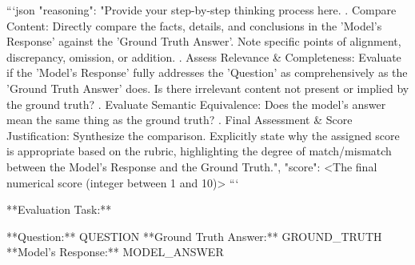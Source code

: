 \begin{tcolorbox}[colback=cadmiumgreen!5!white,colframe=forestgreen!75!white,breakable,title=\textit{LLM judge prompt for the PubMedQA free-form QA task.}]
\begin{VerbatimWrap}
```json
{
    "reasoning": "Provide your step-by-step thinking process here. . Compare Content: Directly compare the facts, details, and conclusions in the 'Model's Response' against the 'Ground Truth Answer'. Note specific points of alignment, discrepancy, omission, or addition. . Assess Relevance & Completeness: Evaluate if the 'Model's Response' fully addresses the 'Question' as comprehensively as the 'Ground Truth Answer' does. Is there irrelevant content not present or implied by the ground truth? . Evaluate Semantic Equivalence: Does the model's answer mean the same thing as the ground truth? . Final Assessment & Score Justification: Synthesize the comparison. Explicitly state why the assigned score is appropriate based on the rubric, highlighting the degree of match/mismatch between the Model's Response and the Ground Truth.",
    "score": <The final numerical score (integer between 1 and 10)>
}
```

**Evaluation Task:**

**Question:** {{QUESTION}}
**Ground Truth Answer:** {{GROUND_TRUTH}}
**Model's Response:** {{MODEL_ANSWER}}
\end{VerbatimWrap}
\end{tcolorbox}
